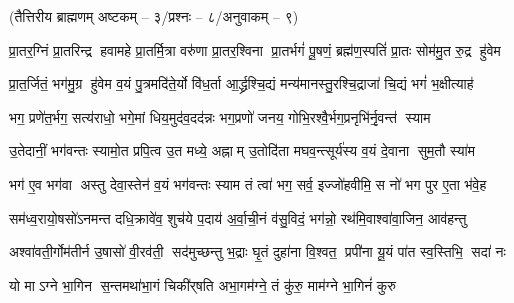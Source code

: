 

\centerline{\normalsize(तैत्तिरीय ब्राह्मणम् अष्टकम् – ३/प्रश्नः – ८/अनुवाकम् – ९)}


\twolineshloka
{प्रा॒तर॒ग्निं प्रा॒तरिन्द्र हवामहे प्रा॒तर्मि॒त्रा वरु॑णा प्रा॒तर॒श्विना}
{प्रा॒तर्भगं॑ पू॒षणं॒ ब्रह्म॑ण॒स्पतिं॑ प्रा॒तः सोम॑मु॒त रु॒द्र हु॑वेम}

\twolineshloka
{प्रा॒त॒र्जितं॒ भग॑मु॒ग्र हु॑वेम व॒यं पु॒त्रमदि॑ते॒र्यो वि॑ध॒र्ता}
{आ॒र्द्ध्रश्चि॒द्यं मन्य॑मानस्तु॒रश्चि॒द्राजा॑ चि॒द्यं भगं॑ भ॒क्षीत्याह॑}

\twolineshloka
{भग॒ प्रणे॑त॒र्भग॒ सत्य॑राधो॒ भगे॒मां धिय॒मुद॑व॒दद॑न्नः}
{भग॒प्रणो॑ जनय॒ गोभि॒रश्वै॒र्भग॒प्रनृभि॑र्नृ॒वन्त॑ स्याम}

\twolineshloka
{उ॒तेदानीं॒ भग॑वन्तः स्यामो॒त प्रपि॒त्व उ॒त मध्ये॒ अह्नाम्}
{उ॒तोदि॑ता मघव॒न्त्सूर्य॑स्य व॒यं दे॒वाना सुम॒तौ स्या॑म}

\twolineshloka
{भग॑ ए॒व भग॑वा अस्तु देवा॒स्तेन॑ व॒यं भग॑वन्तः स्याम}
{तं त्वा॑ भग॒ सर्व॒ इज्जो॑हवीमि॒ स नो॑ भग पुर ए॒ता भ॑वे॒ह}

\twolineshloka
{सम॑ध्व॒रायो॒षसो॑ऽनमन्त दधि॒क्रावे॑व॒ शुच॑ये प॒दाय॑}
{अ॒र्वा॒ची॒नं व॑सु॒विदं॒ भग॑न्नो॒ रथ॑मि॒वाश्वा॑वा॒जिन॒ आव॑हन्तु}

\twolineshloka
{अश्वा॑वती॒र्गोम॑तीर्न उ॒षासो॑ वी॒रव॑ती॒ सद॑मुच्छन्तु भ॒द्राः}
{घृ॒तं दुहा॑ना वि॒श्वत॒ प्रपी॑ना यू॒यं पा॑त स्व॒स्तिभि॒ सदा॑ नः}

\twolineshloka
{यो माऽग्ने भा॒गिन स॒न्तमथा॑भा॒गं चिकी॑र्‌षति}
{अभा॒गम॑ग्ने॒ तं कु॑रु॒ माम॑ग्ने भा॒गिनं॑ कुरु}

